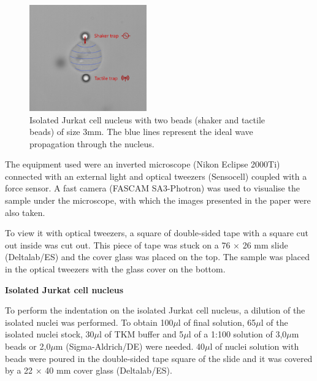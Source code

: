 \documentclass[12pt, a4paper]{article} %
\begin{document}
\begin{figure}
	\centering
	\includegraphics[width=0.45\textwidth]{figures/jurkat_nucleus_waves.png}
	\caption{Isolated Jurkat cell nucleus with two beads (shaker and tactile beads) of size 3mm. The blue lines represent the ideal wave propagation through the nucleus.}
	\label{fig:myfig2}
\end{figure}

The equipment used were an inverted microscope (Nikon Eclipse 2000Ti) connected with an external light and optical tweezers (Sensocell) coupled with a force sensor. A fast camera (FASCAM SA3-Photron) was used to visualise the sample under the microscope, with which the images presented in the paper were also taken.

\setlength{\parskip}{4mm}

To view it with optical tweezers, a square of double-sided tape with a square cut out inside was cut out. This piece of tape was stuck on a 76 $\times$ 26 mm slide (Deltalab/ES) and the cover glass was placed on the top. The sample was placed in the optical tweezers with the glass cover on the bottom.

\setlength{\parindent}{0pt}

{\textbf{Isolated Jurkat cell nucleus}}

To perform the indentation on the isolated Jurkat cell nucleus, a dilution of the isolated nuclei was performed. To obtain 100$\mu$l of final solution, 65$\mu$l of the isolated nuclei stock, 30$\mu$l of TKM buffer and 5$\mu$l of a 1:100 solution of 3,0$\mu$m beads or 2,0$\mu$m (Sigma-Aldrich/DE) were needed. 40$\mu$l of nuclei solution with beads were poured in the double-sided tape square of the slide and it was covered by a 22 $\times$ 40 mm cover glass (Deltalab/ES).

\setlength{\parindent}{8pt}
\end{document}
